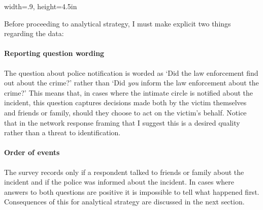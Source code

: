 \documentclass[]{interact}
\theoremstyle{plain}%
\theoremstyle{definition}
\theoremstyle{remark}
\begin{document}
%			

	\begin{table}[p]
	\caption{Numbers of victimized and reported incidents shares tabulated by variables used in this study}
	\centering
	\label{table:table_1}
	\begin{adjustbox}{width=.9\textwidth, height=4.5in}
		
	\end{adjustbox}
	\end{table}	

	Before proceeding to analytical strategy, I must make explicit two things regarding the data:  

	\paragraph*{Reporting question wording} The question about police notification is worded as `Did the law enforcement find out about the crime?' rather than `Did \textit{you} inform the law enforcement about the crime?' This means that, in cases where the intimate circle is notified about the incident, this question captures decisions made both by the victim themselves and friends or family, should they choose to act on the victim's behalf. Notice that in the network response framing that I suggest this is a desired quality rather than a threat to identification.

	\paragraph*{Order of events} The survey records only if a respondent talked to friends or family about the incident and if the police was informed about the incident. In cases where answers to both questions are positive it is impossible to tell what happened first. Consequences of this for analytical strategy are discussed in the next section.


	
		
\end{document}
